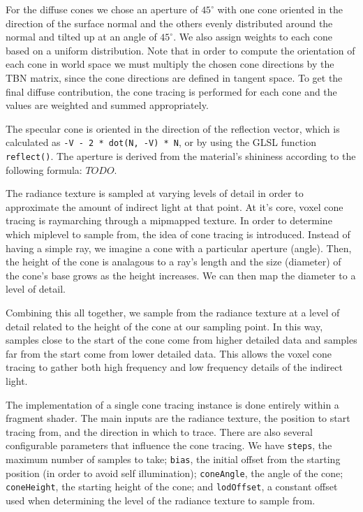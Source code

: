 For the diffuse cones we chose an aperture of $45^\circ$ with one cone oriented in the direction of the surface normal and the others evenly distributed around the normal and tilted up at an angle of $45^\circ$. We also assign weights to each cone based on a uniform distribution. Note that in order to compute the orientation of each cone in world space we must multiply the chosen cone directions by the TBN matrix, since the cone directions are defined in tangent space. To get the final diffuse contribution, the cone tracing is performed for each cone and the values are weighted and summed appropriately.

The specular cone is oriented in the direction of the reflection vector, which is calculated as \texttt{-V - 2 * dot(N, -V) * N}, or by using the GLSL function \texttt{reflect()}. The aperture is derived from the material's shininess according to the following formula: $TODO$.


The radiance texture is sampled at varying levels of detail in order to approximate the amount of indirect light at that point. At it's core, voxel cone tracing is raymarching through a mipmapped texture. In order to determine which miplevel to sample from, the idea of cone tracing is introduced. Instead of having a simple ray, we imagine a cone with a particular aperture (angle). Then, the height of the cone is analagous to a ray's length and the size (diameter) of the cone's base grows as the height increases. We can then map the diameter to a level of detail.

Combining this all together, we sample from the radiance texture at a level of detail related to the height of the cone at our sampling point. In this way, samples close to the start of the cone come from higher detailed data and samples far from the start come from lower detailed data. This allows the voxel cone tracing to gather both high frequency and low frequency details of the indirect light.

The implementation of a single cone tracing instance is done entirely within a fragment shader. The main inputs are the radiance texture, the position to start tracing from, and the direction in which to trace. There are also several configurable parameters that influence the cone tracing. We have \texttt{steps}, the maximum number of samples to take; \texttt{bias}, the initial offset from the starting position (in order to avoid self illumination); \texttt{coneAngle}, the angle of the cone; \texttt{coneHeight}, the starting height of the cone; and \texttt{lodOffset}, a constant offset used when determining the level of the radiance texture to sample from. %

